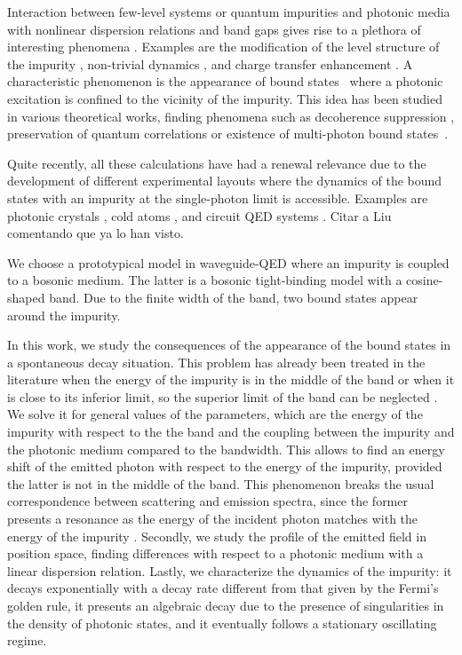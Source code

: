 \documentclass[aps,pra,twocolumn,floatfix,superscriptaddress]{revtex4-1}%
\begin{document}
Interaction between few-level systems or quantum impurities and photonic media with nonlinear dispersion relations and band gaps gives rise to a plethora of interesting phenomena \cite{Lambropoulos2000}. Examples are the modification of the level structure of the impurity \cite{John1990,John1991,Ripoll2015}, non-trivial dynamics \cite{Khalfin1958,Fonda1978,Hack1982,John1994,Gaveau1995,Garmon2013,Redchenko2014,Lombardo2014}, and charge transfer enhancement \cite{Tanaka2006}. %
A characteristic phenomenon is the appearance of bound states\ \cite{John1984,John1987} where a photonic excitation is confined to the vicinity of the impurity. This idea has been studied in various theoretical works, finding phenomena such as decoherence suppression \cite{Tong2010a}, preservation of quantum correlations \cite{Tong2010b,Yang2013,Lu2013} or existence of multi-photon bound states\ \cite{Cirac2015,Calajo2016}. {\color{blue}Quite recently, all these calculations have had a renewal relevance due to the development of different experimental layouts where the dynamics of the bound states with an impurity at the single-photon limit is accessible. Examples are photonic crystals \cite{Arcari2014,Sollner2015,Lodahl2015}, cold atoms \cite{goban2015,thompson2013}, and circuit QED systems \cite{Astafiev2010,Hoi2011,Hoi2013,VanLoo2013,Hoi2013b,liu2016}. {\color{red}Citar a Liu comentando que ya lo han visto.}

We choose a prototypical model in waveguide-QED where an impurity is coupled to a bosonic medium. The latter is a bosonic tight-binding model with a cosine-shaped band. Due to the finite width of the band, two bound states appear around the impurity. 

In this work, we study the consequences of the appearance of the bound states in a spontaneous decay situation. This problem has already been treated in the literature when the energy of the impurity is in the middle of the band \cite{Lombardo2014} or when it is close to its inferior limit, so the superior limit of the band can be neglected \cite{Garmon2013}. We solve it for general values of the parameters, which are the energy of the impurity with respect to the the band and the coupling between the impurity and the photonic medium compared to the bandwidth. This allows to find an energy shift of the emitted photon with respect to the energy of the impurity, provided the latter is not in the middle of the band. This phenomenon breaks the usual correspondence between scattering and emission spectra, since the former presents a resonance as the energy of the incident photon matches with the energy of the impurity \cite{Nori2008a, Fan2005a, Fan2005b}. Secondly, we study the profile of the emitted field in position space, finding differences with respect to a photonic medium with a linear dispersion relation. Lastly, we characterize the dynamics of the impurity: it decays exponentially with a decay rate different from that given by the Fermi's golden rule, it presents an algebraic decay due to the presence of singularities in the density of photonic states, and it eventually follows a stationary oscillating regime.}
\end{document}

